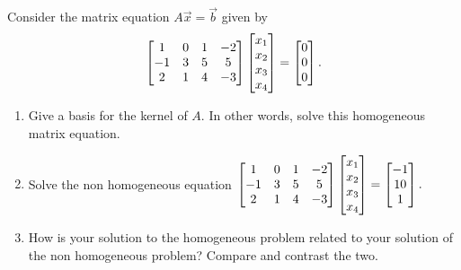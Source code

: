 \begin{problem}
Consider the matrix equation $A\vec x=\vec b$ given by 
$$\begin{bmatrix}
\begin{matrix} 1\\-1\\2 \end{matrix}&
\begin{matrix} 0\\3\\1 \end{matrix}&
\begin{matrix} 1\\5\\4 \end{matrix}&
\begin{matrix} -2\\5\\-3 \end{matrix}
\end{bmatrix}
\begin{bmatrix}x_1\\x_2\\x_3\\x_4\end{bmatrix}
=
\begin{bmatrix}0\\0\\0\end{bmatrix}.$$ 
\begin{enumerate}
 \item Give a basis for the kernel of $A$. In other words, solve this homogeneous matrix equation.
 \item Solve the non homogeneous equation
$\begin{bmatrix}
\begin{matrix} 1\\-1\\2 \end{matrix}&
\begin{matrix} 0\\3\\1 \end{matrix}&
\begin{matrix} 1\\5\\4 \end{matrix}&
\begin{matrix} -2\\5\\-3 \end{matrix}
\end{bmatrix}
\begin{bmatrix}x_1\\x_2\\x_3\\x_4\end{bmatrix}
=
\begin{bmatrix}-1\\10\\1\end{bmatrix}.$ 

 \item How is your solution to the homogeneous problem related to your solution of the non homogeneous problem?  Compare and contrast the two. 
\end{enumerate}
\end{problem}


